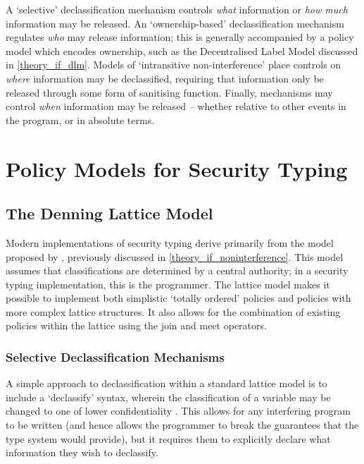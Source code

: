 A `selective' declassification mechanism controls \textit{what} information or \textit{how much} information may be released. An `ownership-based' declassification mechanism regulates \textit{who} may release information; this is generally accompanied by a policy model which encodes ownership, such as the Decentralised Label Model discussed in \ref{theory_if_dlm}. Models of `intransitive non-interference' \cite{roscoe1999intransitive} place controls on \textit{where} information may be declassified, requiring that information only be released through some form of sanitising function. Finally, mechanisms may control \textit{when} information may be released -- whether relative to other events in the program, or in absolute terms.

\section{Policy Models for Security Typing}

\subsection{The Denning Lattice Model}

Modern implementations of security typing derive primarily from the model proposed by \citeauthor{denning1977certification} \cite{denning1977certification}, previously discussed in \ref{theory_if_noninterference}. This model assumes that classifications are determined by a central authority; in a security typing implementation, this is the programmer. The lattice model makes it possible to implement both simplistic `totally ordered' policies and policies with more complex lattice structures. It also allows for the combination of existing policies within the lattice using the join and meet operators.

\subsubsection{Selective Declassification Mechanisms}

A simple approach to declassification within a standard lattice model is to include a `declassify' syntax, wherein the classification of a variable may be changed to one of lower confidentiality \cite{denning1974declassification}. This allows for any interfering program to be written (and hence allows the programmer to break the guarantees that the type system would provide), but it requires them to explicitly declare what information they  wish to declassify.

